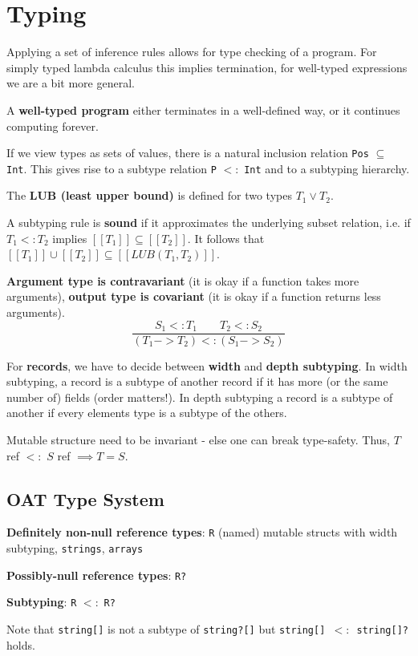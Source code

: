 \section*{Typing}

Applying a set of inference rules allows for type checking of a program. For simply typed lambda calculus this implies termination, for well-typed expressions we are a bit more general. \medskip

A \textbf{well-typed program} either terminates in a well-defined way, or it continues computing forever.\medskip
	
If we view types as sets of values, there is a natural inclusion relation \texttt{Pos} $ \subseteq $ \texttt{Int}. This gives rise to a subtype relation \texttt{P} $<:$ \texttt{Int} and to a subtyping hierarchy. \medskip

The \textbf{LUB (least upper bound)} is defined for two types $T_1 \vee T_2$.\medskip
	
A subtyping rule is \textbf{sound} if it approximates the underlying subset relation, i.e. if $T_1 <: T_2$ implies $[[T_1]] \subseteq [[T_2]]$. It follows that $[[T_1]] \cup [[T_2]] \subseteq [[LUB(T_1, T_2)]]$. \medskip
	
\textbf{Argument type is contravariant} (it is okay if a function takes more arguments), \textbf{output type is covariant} (it is okay if a function returns less arguments).
	$$\frac{S_1 <: T_1 \qquad T_2 <: S_2}{(T_1 -> T_2) <: (S_1 -> S_2)}$$\medskip
	
For \textbf{records}, we have to decide between \textbf{width} and \textbf{depth subtyping}. In width subtyping, a record is a subtype of another record if it has more (or the same number of) fields (order matters!). In depth subtyping a record is a subtype of another if every elements type is a subtype of the others.\medskip

Mutable structure need to be invariant - else one can break type-safety. Thus, $T$ ref $<:$ $S$ ref $\implies T = S$.


\subsection*{OAT Type System}
	
\textbf{Definitely non-null reference types}: \texttt{R} (named) mutable structs with width subtyping, \texttt{strings}, \texttt{arrays} \medskip
	
\textbf{Possibly-null reference types}: \texttt{R?} \medskip
	
\textbf{Subtyping}: \texttt{R} $<:$ \texttt{R?}\medskip

Note that \texttt{string[]} is not a subtype of \texttt{string?[]} but \texttt{string[] $<:$ string[]?} holds.
